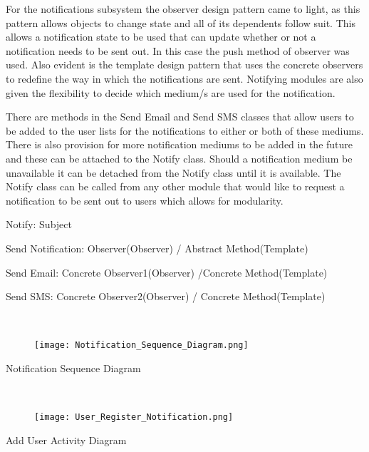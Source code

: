 \documentclass{article}
\begin{document}
    \begin{flushleft}
    
        For the notifications subsystem the observer design pattern came to light, as this pattern allows objects to change state and all of its dependents follow suit. This allows a notification state to be used that can update whether or not a notification needs to be sent out. In this case the push method of observer was used. Also evident is the template design pattern that uses the concrete observers to redefine the way in which the notifications are sent. Notifying modules are also given the flexibility to decide which medium/s are used for the notification.
        
        \bigskip

        
        There are methods in the Send Email and Send SMS classes that allow users to be added to the user lists for the notifications to either or both of these mediums. There is also provision for more notification mediums to be added in the future and these can be attached to the Notify class. Should a notification medium be unavailable it can be detached from the Notify class until it is available. The Notify class can be called from any other module that would like to request a notification to be sent out to users which allows for modularity.
        
        \bigskip

        Notify: Subject
        

        Send Notification: Observer(Observer) / Abstract Method(Template)
        

        Send Email: Concrete Observer1(Observer) /Concrete Method(Template)
        

        Send SMS: Concrete Observer2(Observer) / Concrete Method(Template)
    
    \end{flushleft}
    
    \mbox{}\\
    \bigskip
    \clearpage
    
    \begin{figure}[h!]
        \texttt{[image: Notification\_Sequence\_Diagram.png]}
    \end{figure}
    Notification Sequence Diagram
    
    \mbox{}\\
    \bigskip
    \clearpage
    
    \begin{figure}[h!]
        \texttt{[image: User\_Register\_Notification.png]}
    \end{figure}
    Add User Activity Diagram
    
\end{document}
